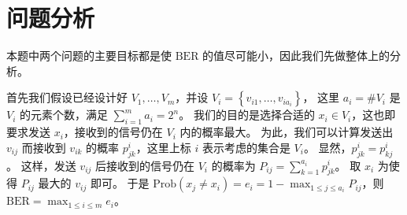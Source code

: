 \section{问题分析}

本题中两个问题的主要目标都是使 \(\mathrm{BER}\) 的值尽可能小，因此我们先做整体上的分析。

首先我们假设已经设计好 \(V_1,\dots,V_m\)，并设 \(V_i=\left\{v_{i1},\dots,v_{ia_i}\right\}\)，
这里 \(a_i=\#V_i\) 是 \(V_i\) 的元素个数，满足 \(\sum_{i=1}^m a_i=2^n\)。
我们的目的是选择合适的 \(x_i\in V_i\)，这也即要求发送 \(x_i\)，接收到的信号仍在 \(V_i\) 内的概率最大。
为此，我们可以计算发送出 \(v_{ij}\) 而接收到 \(v_{ik}\) 的概率 \(p^i_{jk}\)，这里上标 \(i\) 表示考虑的集合是 \(V_i\)。
显然，\(p^i_{jk}=p^i_{kj}\)。
这样，发送 \(v_{ij}\) 后接收到的信号仍在 \(V_i\) 的概率为 \(P_{ij}=\sum_{k=1}^{a_i}p^i_{jk}\)。
取 \(x_i\) 为使得 \(P_{ij}\) 最大的 \(v_{ij}\) 即可。
于是 \(\mathrm{Prob}\left(x_j\ne x_i\right)=e_i=1-\max_{1\le j\le a_i}P_{ij}\)，则 \(\mathrm{BER}=\max_{1\le i\le m}e_i\)。
